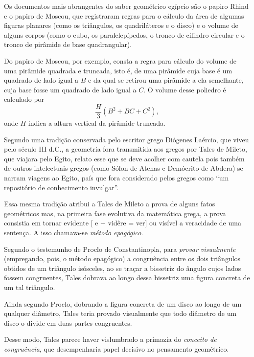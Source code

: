 \documentclass{hipatia}
\begin{document}
Os documentos mais abrangentes do saber geométrico egípcio são o papiro Rhind e o papiro de Moscou, que registraram regras para o cálculo da área de algumas figuras planares (como os triângulos, os quadriláteros e o disco) e o volume de alguns corpos (como o cubo, os paralelepípedos, o tronco de cilindro circular e o tronco de pirâmide de base quadrangular).

Do papiro de Moscou, por exemplo, consta a regra para cálculo do volume de uma pirâmide quadrada e truncada, isto é, de uma pirâmide cuja base é um quadrado de lado igual a $B$ e da qual se retirou uma pirâmide a ela semelhante, cuja base fosse um quadrado de lado igual a $C$. O volume desse poliedro é calculado por $$\frac{H}{3}\left(B^2 + BC + C^2\right),$$ onde $H$ indica a altura vertical da pirâmide truncada. \cite[p. 7]{anglin1995}

Segundo uma tradição conservada pelo escritor grego Diógenes Laércio, que viveu pelo século III d.C., a geometria fora transmitida aos gregos por Tales de Mileto, que viajara pelo Egito, relato esse que se deve acolher com cautela pois também de outros intelectuais gregos (como Sólon de Atenas e Demócrito de Abdera) se narram viagens ao Egito, país que fora considerado pelos gregos como ``um repositório de conhecimento invulgar''.  \cite[p. 11]{momigliano1991}

Essa mesma tradição atribui a Tales de Mileto a prova de alguns fatos geométricos mas, na primeira fase evolutiva da matemática grega, a prova consistia em tornar evidente  [ e + vidêre = ver]  ou visível a veracidade de uma sentença. A isso chamava-se \emph{método epagógico}. \cite[p. 127--128]{otte2006}

Segundo o testemunho de Proclo de Constantinopla, para \emph{provar visualmente} (empregando, pois, o método epagógico) a congruência entre os dois triângulos obtidos de um triângulo isósceles, ao se traçar a bissetriz do ângulo cujos lados fossem congruentes, Tales dobrava ao longo dessa bissetriz uma figura concreta de um tal triângulo. 

Ainda segundo Proclo, dobrando a figura concreta de um disco ao longo de um qualquer diâmetro, Tales teria provado visualmente que todo diâmetro de um disco o divide em duas partes congruentes.  \cite[p. 25]{coolidge1940}\cite[p. 25]{mosterin1984}

Desse modo, Tales parece haver vislumbrado a primazia do \emph{conceito de congruência}, que desempenharia papel decisivo no pensamento geométrico. 
\end{document}
